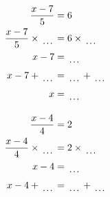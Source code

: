 \documentclass[12pt]{article}
\newcounter{minipagecount}
\begin{document}
\begin{multicols}{2}
\begin{minipage}[t]{0.45\textwidth}
    \raggedright %
    \begin{align*} %
        \frac{x - 7}{5} &= 6\\
        \frac{x - 7}{5} \times\dotuline{\hspace{5mm}} &= 6 \times\dotuline{\hspace{5mm}}\\
        x - 7 &= \dotuline{\hspace{5mm}}\\
        x - 7 + \dotuline{\hspace{5mm}} &= \dotuline{\hspace{5mm}} + \dotuline{\hspace{5mm}}\\
        x &= \dotuline{\hspace{5mm}}\\
    \end{align*}
\end{minipage} %
\noindent{(\theminipagecount)}\hspace{0.1mm} %
\begin{minipage}[t]{0.45\textwidth} %
    \vspace{-26pt}  %
    \raggedright %
    \begin{align*} %
        \frac{x - 4}{4} &= 2\\
        \frac{x - 4}{4} \times\dotuline{\hspace{5mm}} &= 2 \times\dotuline{\hspace{5mm}}\\
        x - 4 &= \dotuline{\hspace{5mm}}\\
        x - 4 + \dotuline{\hspace{5mm}} &= \dotuline{\hspace{5mm}} + \dotuline{\hspace{5mm}}\\

\end{align*}
\end{minipage}
\end{multicols}
\end{document}
